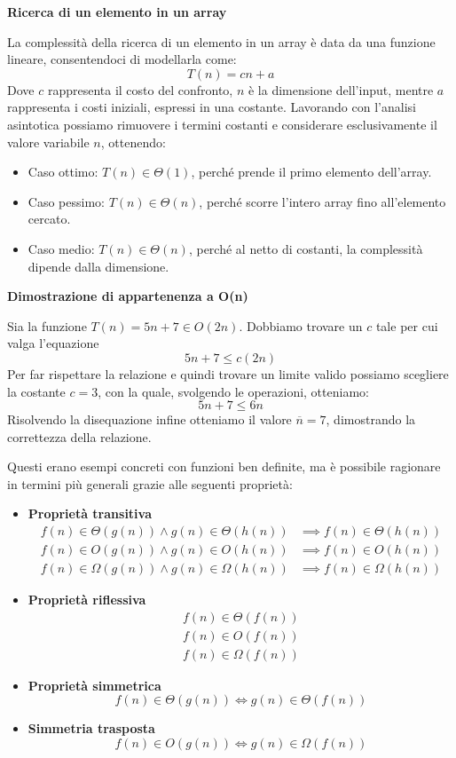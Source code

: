 \begin{esempio}
	\textbf{Ricerca di un elemento in un array}\par
	\noindent La complessità della ricerca di un elemento in un array è data da una funzione lineare, consentendoci di modellarla come: \[T(n) = cn + a\]
	\noindent Dove $c$ rappresenta il costo del confronto, $n$ è la dimensione dell'input, mentre $a$ rappresenta i costi iniziali, espressi in una costante. Lavorando con l'analisi asintotica possiamo rimuovere i termini costanti e considerare esclusivamente il valore variabile $n$, ottenendo: \begin{itemize}
		\item Caso ottimo: $T(n) \in \Theta(1)$, perché prende il primo elemento dell'array.
		\item Caso pessimo: $T(n) \in \Theta(n)$, perché scorre l'intero array fino all'elemento cercato.
		\item Caso medio: $T(n) \in \Theta(n)$, perché al netto di costanti, la complessità dipende dalla dimensione.
	\end{itemize}
\end{esempio}
\begin{esempio}
	\textbf{Dimostrazione di appartenenza a O(n)}\par 
	\noindent Sia la funzione $T(n) = 5n+7 \in O(2n)$. Dobbiamo trovare un $c$ tale per cui valga l'equazione \[5n+7 \leq c(2n)\]
	\noindent Per far rispettare la relazione e quindi trovare un limite valido possiamo scegliere la costante $c=3$, con la quale, svolgendo le operazioni, otteniamo: \[5n+7 \leq 6n\]
	\noindent Risolvendo la disequazione infine otteniamo il valore $\overline{n}=7$, dimostrando la correttezza della relazione.
\end{esempio}
\noindent Questi erano esempi concreti con funzioni ben definite, ma è possibile ragionare in termini più generali grazie alle seguenti proprietà:
\begin{itemize}
	\item \textbf{Proprietà transitiva} \begin{equation}
		\begin{split}
			f(n) \in \Theta(g(n)) \land g(n) \in \Theta(h(n)) &\implies f(n) \in\Theta(h(n))\\
			f(n) \in O(g(n)) \land g(n) \in O(h(n)) &\implies f(n) \in O(h(n))\\
			f(n) \in \Omega(g(n)) \land g(n) \in \Omega(h(n)) &\implies f(n) \in\Omega(h(n))
		\end{split}
	\end{equation}
	\item \textbf{Proprietà riflessiva} \begin{equation}
		\begin{split}
			f(n) \in \Theta(f(n))\\
			f(n) \in O(f(n))\\
			f(n) \in \Omega(f(n))
		\end{split}
	\end{equation}
	\item \textbf{Proprietà simmetrica} \[f(n) \in \Theta(g(n)) \iff g(n)\in \Theta(f(n))\]
	\item \textbf{Simmetria trasposta} \[f(n) \in O(g(n)) \iff g(n)\in \Omega(f(n))\]
\end{itemize}
